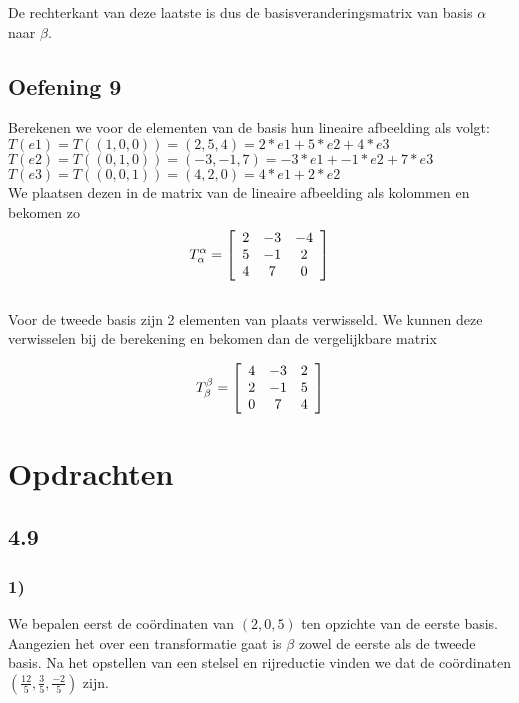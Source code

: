 \documentclass[lineaire_algebra_oplossingen.tex]{subfiles}
\begin{document}
De rechterkant van deze laatste is dus de basisveranderingsmatrix van basis $\alpha$ naar $\beta$.
\subsection{Oefening 9}

Berekenen we voor de elementen van de basis hun lineaire afbeelding als volgt:\\

$T(e1) = T( (1,0,0) ) = (2,5,4) = 2 * e1 + 5 * e2 + 4 * e3$\\

$T(e2) = T( (0,1,0) ) = (-3,-1,7) = -3 * e1 + -1 * e2 + 7 * e3$\\

$T(e3) = T( (0,0,1) ) = (4,2,0) = 4 * e1 + 2 * e2$\\

We plaatsen dezen in de matrix van de lineaire afbeelding als kolommen en bekomen zo\\

\[
T^{\alpha}_{\alpha} =
\left[
\begin{array}{c c c}
2 & -3 & -4\\
5 & -1 & 2\\
4 & 7 & 0
\end{array}
\right]
\]\\

Voor de tweede basis zijn 2 elementen van plaats verwisseld. We kunnen deze verwisselen bij de berekening en bekomen dan de vergelijkbare matrix

\[
T^{\beta}_{\beta} =
\left[
\begin{array}{c c c}
4 & -3 & 2\\
2 & -1 & 5\\
0 & 7 & 4
\end{array}
\right]
\]
\section{Opdrachten}

\subsection{4.9}
\subsubsection*{1)}
We bepalen eerst de co\"ordinaten van $(2,0,5)$ ten opzichte van de eerste basis. Aangezien het over een transformatie gaat is $\beta$ zowel de eerste als de tweede basis. 
Na het opstellen van een stelsel en rijreductie vinden we dat de co\"ordinaten $\left(\frac{12}{5},\frac{3}{5},\frac{-2}{5}\right)$ zijn.
\end{document}
